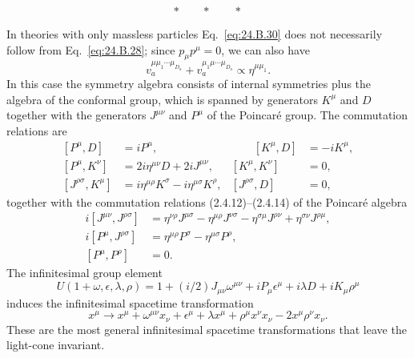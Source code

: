 \[
 *\qquad *\qquad *
\]

In theories with only massless particles Eq.~\eqref{eq:24.B.30} does not
necessarily follow from Eq.~\eqref{eq:24.B.28}; since $p_\mu p^\mu=0$, we can
also have
\begin{equation}
 v_a^{\mu\mu_1\cdots\mu_{D_a}}
 +v_a^{\mu_1\mu\cdots\mu_{D_a}}
 \propto\eta^{\mu\mu_1}.
\tag{24.B.33}\label{eq:24.B.33}
\end{equation}
In this case the symmetry algebra consists of internal symmetries plus the
algebra of the conformal group, which is spanned by generators $K^\mu$ and $D$
together with the generators $J^{\mu\nu}$ and $P^\mu$ of the Poincar\'e group.
The commutation relations are
\begin{equation}
\begin{aligned}
 [P^\mu,D]&=iP^\mu,
 &\qquad [K^\mu,D]&=-iK^\mu,
 \\
 [P^\mu,K^\nu]&=2i\eta^{\mu\nu}D+2iJ^{\mu\nu},
 & [K^\mu,K^\nu]&=0,
 \\
 [J^{\rho\sigma},K^\mu]
 &=i\eta^{\mu\rho}K^\sigma-i\eta^{\mu\sigma}K^\rho,
 & [J^{\rho\sigma},D]&=0,
\end{aligned}
\tag{24.B.34}\label{eq:24.B.34}
\end{equation}
together with the commutation relations (2.4.12)--(2.4.14) of the Poincar\'e
algebra
\begin{equation}
\begin{aligned}
 i[J^{\mu\nu},J^{\rho\sigma}]
 &=\eta^{\nu\rho}J^{\mu\sigma}
 -\eta^{\mu\rho}J^{\nu\sigma}
 -\eta^{\sigma\mu}J^{\rho\nu}
 +\eta^{\sigma\nu}J^{\rho\mu},
 \\
 i[P^\mu,J^{\rho\sigma}]
 &=\eta^{\mu\rho}P^\sigma-\eta^{\mu\sigma}P^\rho,
 \\
 [P^\mu,P^\rho]&=0.
\end{aligned}
\tag{24.B.35}\label{eq:24.B.35}
\end{equation}
The infinitesimal group element
\begin{equation}
 U(1+\omega,\epsilon,\lambda,\rho)
 =1+(i/2)J_{\mu\nu}\omega^{\mu\nu}
 +iP_\mu\epsilon^\mu+i\lambda D+iK_\mu\rho^\mu
\tag{24.B.36}\label{eq:24.B.36}
\end{equation}
induces the infinitesimal spacetime transformation
\begin{equation}
 x^\mu\longrightarrow x^\mu+\omega^{\mu\nu}x_\nu+\epsilon^\mu
 +\lambda x^\mu+\rho^\mu x^\nu x_\nu-2x^\mu\rho^\nu x_\nu.
\tag{24.B.37}\label{eq:24.B.37}
\end{equation}
These are the most general infinitesimal spacetime transformations that leave
the light-cone invariant.
